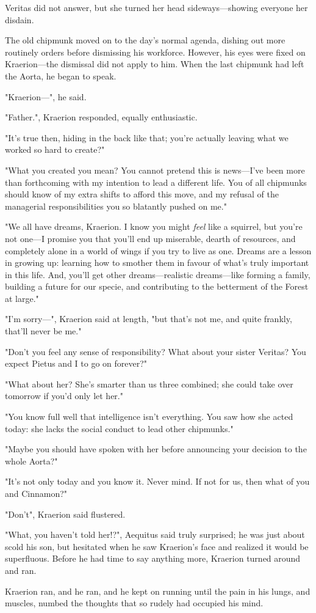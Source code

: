 Veritas did not answer, but she turned her head sideways---showing everyone her disdain.

The old chipmunk moved on to the day's normal agenda, dishing out more routinely orders before dismissing his workforce. However, his eyes were fixed on Kraerion---the dismissal did not apply to him. When the last chipmunk had left the Aorta, he began to speak.

"Kraerion---", he said.

"Father.", Kraerion responded, equally enthusiastic.

"It's true then, hiding in the back like that; you're actually leaving what we worked so hard to create?"

"What you created you mean? You cannot pretend this is news---I've been more than forthcoming with my intention to lead a different life. You of all chipmunks should know of my extra shifts to afford this move, and my refusal of the managerial responsibilities you so blatantly pushed on me."

"We all have dreams, Kraerion. I know you might \textit{feel} like a squirrel, but you're not one---I promise you that you'll end up miserable, dearth of resources, and completely alone in a world of wings if you try to live as one.
Dreams are a lesson in growing up: learning how to smother them in favour of what's truly important in this life. And, you'll get other dreams---realistic dreams---like forming a family, building a future for our specie, and contributing to the betterment of the Forest at large."

"I'm sorry---", Kraerion said at length, "but that's not me, and quite frankly, that'll never be me."

"Don't you feel any sense of responsibility? What about your sister Veritas? You expect Pietus and I to go on forever?"

"What about her? She's smarter than us three combined; she could take over tomorrow if you'd only let her."

"You know full well that intelligence isn't everything. You saw how she acted today: she lacks the social conduct to lead other chipmunks."

"Maybe you should have spoken with her before announcing your decision to the whole Aorta?"

"It's not only today and you know it. Never mind. If not for us, then what of you and Cinnamon?"

"Don't", Kraerion said flustered.

"What, you haven't told her!?", Aequitus said truly surprised; he was just about scold his son, but hesitated when he saw Kraerion's face and realized it would be superfluous. Before he had time to say anything more, Kraerion turned around and ran.

Kraerion ran, and he ran, and he kept on running until the pain in his lungs, and muscles, numbed the thoughts that so rudely had occupied his mind.

